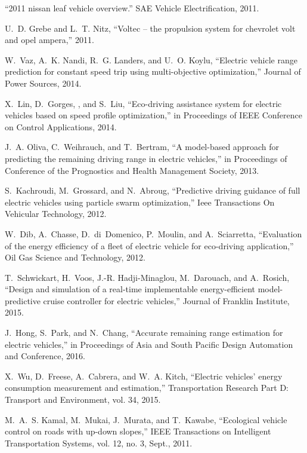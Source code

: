 ``2011 nissan leaf vehicle overview.'' SAE Vehicle Electrification, 2011.

U.~D. Grebe and L.~T. Nitz, ``Voltec – the propulsion system for chevrolet
  volt and opel ampera,'' 2011.

W.~Vaz, A.~K. Nandi, R.~G. Landers, and U.~O. Koylu, ``Electric vehicle range
  prediction for constant speed trip using multi-objective optimization,'' 
  Journal of Power Sources, 2014.

X.~Lin, D.~Gorges, , and S.~Liu, ``Eco-driving assistance system for electric
  vehicles based on speed profile optimization,'' in Proceedings of IEEE
  Conference on Control Applications, 2014.

J.~A. Oliva, C.~Weihrauch, and T.~Bertram, ``A model-based approach for
  predicting the remaining driving range in electric vehicles,'' in 
  Proceedings of Conference of the Prognostics and Health Management Society,
  2013.

S.~Kachroudi, M.~Grossard, and N.~Abroug, ``Predictive driving guidance of full
  electric vehicles using particle swarm optimization,'' Ieee Transactions
  On Vehicular Technology, 2012.

W.~Dib, A.~Chasse, D.~di~Domenico, P.~Moulin, and A.~Sciarretta, ``Evaluation
  of the energy efficiency of a fleet of electric vehicle for eco-driving
  application,'' Oil Gas Science and Technology, 2012.

T.~Schwickart, H.~Voos, J.-R. Hadji-Minaglou, M.~Darouach, and A.~Rosich,
  ``Design and simulation of a real-time implementable energy-efficient
  model-predictive cruise controller for electric vehicles,'' Journal of
  Franklin Institute, 2015.

J.~Hong, S.~Park, and N.~Chang, ``Accurate remaining range estimation for
  electric vehicles,'' in Proceedings of Asia and South Pacific Design
  Automation and Conference, 2016.

X.~Wu, D.~Freese, A.~Cabrera, and W.~A. Kitch, ``Electric vehicles’ energy
  consumption measurement and estimation,'' Transportation Research Part
  D: Transport and Environment, vol. 34, 2015.

M.~A.~S. Kamal, M.~Mukai, J.~Murata, and T.~Kawabe, ``Ecological vehicle
  control on roads with up-down slopes,'' IEEE Transactions on Intelligent
  Transportation Systems, vol. 12, no. 3, Sept., 2011.

